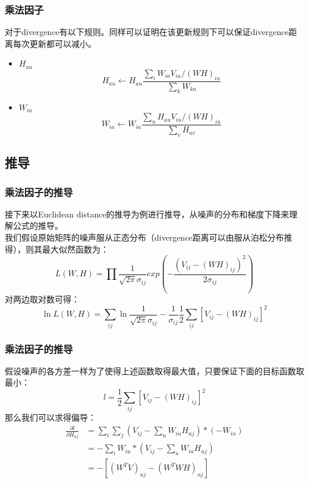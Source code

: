 \documentclass[UTF8,mathserif]{beamer}
\begin{document}
\begin{frame}
\frametitle{乘法因子}
    \indent 对于divergence有以下规则。同样可以证明在该更新规则下可以保证divergence距离每次更新都可以减小。\\
    \begin{itemize}
        \item $H_{au}$\\
            $$H_{au}\leftarrow H_{au}\frac{\sum_{i}W_{ia}V_{iu}/(WH)_{iu}}{\sum_{k}W_{ka}}$$
        \item $W_{ia}$\\
            $$W_{ia}\leftarrow W_{ia}\frac{\sum_{u}H_{au}V_{iu}/(WH)_{iu}}{\sum_{v}H_{av}}$$
    \end{itemize}
\end{frame}

\subsection{推导}

\begin{frame}
\frametitle{乘法因子的推导}
    \indent 接下来以Euclidean distance的推导为例进行推导，从噪声的分布和梯度下降来理解公式的推导。\\
    \indent 我们假设原始矩阵的噪声服从正态分布（divergence距离可以由服从泊松分布推得），则其最大似然函数为：\\
    \begin{equation}
    	L(W,H)=\prod\frac{1}{\sqrt{2\pi}\sigma_{ij}}exp(-\frac{(V_{ij}-(WH)_{ij})^{2}}{2\sigma_{ij}})
    \end{equation}
    \indent 对两边取对数可得：\\
    \begin{equation}
        \ln{L(W,H)}=\sum_{ij}\ln{\frac{1}{\sqrt{2\pi}\sigma_{ij}}}-\frac{1}{\sigma_{ij}}\frac{1}{2}\sum_{ij}[V_{ij}-(WH)_{ij}]^{2}
    \end{equation}
\end{frame}



\begin{frame}
\frametitle{乘法因子的推导}
    \indent 假设噪声的各方差一样为了使得上述函数取得最大值，只要保证下面的目标函数取最小：\\
    \begin{equation}
        l=\frac{1}{2}\sum_{ij}[V_{ij}-(WH)_{ij}]^{2}
    \end{equation}
    \indent 那么我们可以求得偏导：\\
    \begin{equation}
        \begin{split}
           \frac{\partial{l}}{\partial{H_{uj}}} & = \sum_{i}\sum_{j}(V_{ij}-\sum_{u}W_{iu}H_{uj})*(-W_{iu})\\
             & = -\sum_{i}W_{iu}*(V_{ij}-\sum_{u}W_{iu}H_{uj})\\
             & = -[(W^{T}V)_{uj}-(W^{T}WH)_{uj}]
        \end{split}
    \end{equation}
\end{frame}
\end{document}
